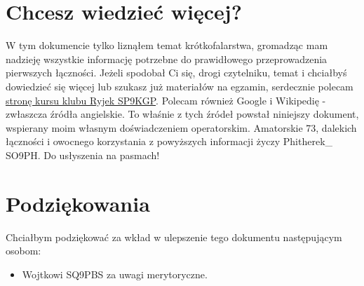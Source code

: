 \documentclass[a4paper,11pt]{article}
\begin{document}
\section{Chcesz wiedzieć więcej?}
W tym dokumencie tylko liznąłem temat krótkofalarstwa, gromadząc mam nadzieję wszystkie informację potrzebne do prawidłowego przeprowadzenia pierwszych łączności. Jeżeli spodobał Ci się, drogi czytelniku, temat i chciałbyś dowiedzieć się więcej lub szukasz już materiałów na egzamin, serdecznie polecam \href{http://kurs.sp9kgp.org}{stronę kursu klubu Ryjek SP9KGP}. Polecam również Google i Wikipedię - zwłaszcza źródła angielskie. To właśnie z tych źródeł powstał niniejszy dokument, wspierany moim własnym doświadczeniem operatorskim. Amatorskie 73, dalekich łączności i owocnego korzystania z powyższych informacji życzy Phitherek\_ SO9PH. Do usłyszenia na pasmach!
\section{Podziękowania}
Chciałbym podziękować za wkład w ulepszenie tego dokumentu następującym osobom:
\begin{itemize}
\item Wojtkowi SQ9PBS za uwagi merytoryczne.
\end{itemize}
\end{document}
